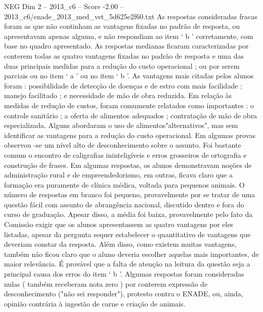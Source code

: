 \begin{textsample}{NEG Dim 2 – 2013\_c6 – Score -2.00 – 2013\_c6/enade\_2013\_med\_vet\_5d625e2f60.txt}
As respostas consideradas fracas foram as que não continham as vantagens fixadas no padrão de resposta, ou apresentavam apenas alguma, e não respondiam ao item ‘ b ’ corretamente, com base no quadro apresentado.
As respostas medianas ficaram caracterizadas por conterem todas as quatro vantagens fixadas no padrão de resposta e uma das duas principais medidas para a redução do custo operacional ; ou por serem parciais ou no item ‘ a ’ ou no item ‘ b ’.
As vantagens mais citadas pelos alunos foram : possibilidade de detecção de doenças e de estro com mais facilidade ; manejo facilitado ; e necessidade de mão de obra reduzida.
Em relação às medidas de redução de custos, foram comumente relatados como importantes : o controle sanitário ; a oferta de alimentos adequados ; contratação de mão de obra especializada.
Alguns abordaram o uso de alimentos"alternativos", mas sem identificar as vantagens para a redução do custo operacional.
Em algumas provas observou -se um nível alto de desconhecimento sobre o assunto.
Foi bastante comum o encontro de caligrafias ininteligíveis e erros grosseiros de ortografia e construção de frases.
Em algumas respostas, os alunos demonstravam noções de administração rural e de empreendedorismo, em outras, ficava claro que a formação era puramente de clínica médica, voltada para pequenos animais.
O número de respostas em branco foi pequeno, provavelmente por se tratar de uma questão fácil com assunto de abrangência nacional, discutido dentro e fora do curso de graduação.
Apesar disso, a média foi baixa, provavelmente pelo fato da Comissão exigir que os alunos apresentassem as quatro vantagens por eles listadas, apesar da pergunta sequer estabelecer o quantitativo de vantagens que deveriam constar da resposta.
Além disso, como existem muitas vantagens, também não ficou claro que o aluno deveria escolher aquelas mais importantes, de maior relevância.
É provável que a falta de atenção na leitura da questão seja a principal causa dos erros do item ‘ b ’.
Algumas respostas foram consideradas nulas ( também receberam nota zero ) por conterem expressão de desconhecimento ("não sei responder"), protesto contra o ENADE, ou, ainda, opinião contrária à ingestão de carne e criação de animais.

\end{textsample}
